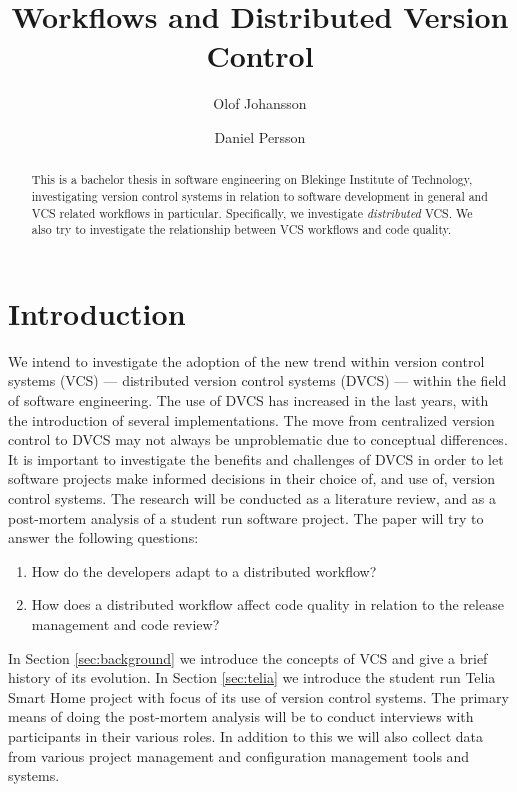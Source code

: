 \documentclass{llncs}
\title{Workflows and Distributed Version Control}
\author{Olof Johansson \and Daniel Persson}
\institute{Blekinge Institute of Technology}
\begin{document}
\maketitle

\begin{abstract}
 This is a bachelor thesis in software engineering on Blekinge
 Institute of Technology, investigating version control systems
 in relation to software development in general and VCS related
 workflows in particular. Specifically, we investigate
 \emph{distributed} VCS. We also try to investigate the
 relationship between VCS workflows and code quality.
\end{abstract}

\section{Introduction}

We intend to investigate the adoption of the new trend within version
control systems (VCS) --- distributed version control systems (DVCS)
--- within the field of software engineering. The use of DVCS has
increased in the last years, with the introduction of several
implementations. The move from centralized version control to DVCS may
not always be unproblematic due to conceptual differences. It is
important to investigate the benefits and challenges of DVCS in order
to let software projects make informed decisions in their choice of,
and use of, version control systems. The research will be conducted as
a literature review, and as a post-mortem analysis of a student run
software project. The paper will try to answer the following questions:

\begin{enumerate}
 \item How do the developers adapt to a distributed workflow?
 \item How does a distributed workflow affect code quality in relation
       to the release management and code review?
\end{enumerate}

In Section \ref{sec:background} we introduce the concepts of VCS and
give a brief history of its evolution. In Section \ref{sec:telia} we
introduce the student run Telia Smart Home project with focus of its
use of version control systems. The primary means of doing the
post-mortem analysis will be to conduct interviews with participants
in their various roles. In addition to this we will also collect data
from various project management and configuration management tools and
systems.
\end{document}
